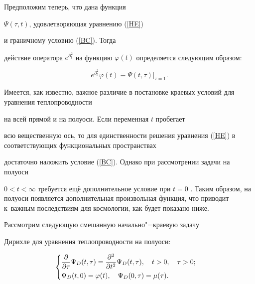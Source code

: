 Предположим теперь, что дана функция

$\Psi(\tau,t)$, удовлетворяющая уравнению (\ref{HE})

и граничному условию (\ref{BC}). Тогда

действие оператора $e^{\partial_t ^2}$ на функцию $\varphi(t)$ определяется следующим образом:

\begin{equation*}


e^{\partial_t ^2}\varphi(t)\equiv \Psi(t,\tau)|_{\tau=1}.

\end{equation*}



Имеется, как известно, важное различие  в постановке краевых условий для уравнения теплопроводности

на всей прямой и на полуоси. Если переменная $t$ пробегает

всю вещественную ось, то для единственности решения уравнения (\ref{HE}) в соответствующих функциональных пространствах

достаточно наложить условие (\ref{BC}).  Однако при рассмотрении задачи на полуоси

 $0<t< \infty$ требуется ещё дополнительное условие при $t=0$ \cite{VSV-textbook}.  Таким образом, на полуоси появляется дополнительная произвольная функция, что приводит к~важным последствиям для космологии, как будет показано ниже.









Рассмотрим следующую смешанную начально"=краевую задачу

Дирихле для уравнения теплопроводности на полуоси:

\begin{equation}

\label{HE-bc-ic}

\begin{cases}

\displaystyle \frac{\partial}{\partial \tau}\Psi_D(t,\tau)=

\frac{\partial^2}{\partial t^2}\Psi_{D}(t,\tau),\quad t>0, \quad \tau>0; \vspace{1mm}\\

\Psi_{D}(t, 0)=\varphi(t),\quad 

\Psi_{D}(0,\tau)=\mu(\tau).

\end{cases}\end{equation}



